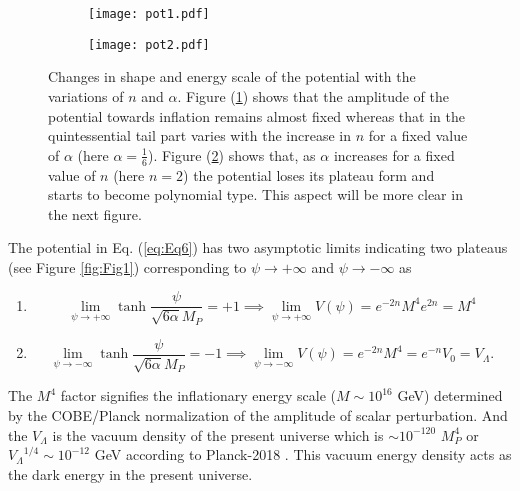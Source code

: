 \documentclass[a4paper,11pt]{article}
\begin{document}
\begin{figure}[H]
    \begin{subfigure}{0.5\linewidth}
  \centering
   \texttt{[image: pot1.pdf]}
   \subcaption{}
   \label{fig:Fig2a}
\end{subfigure}
\begin{subfigure}{0.5\linewidth}
  \centering
   \texttt{[image: pot2.pdf]}
   \subcaption{}
    \label{fig:Fig2b}
\end{subfigure}
     \caption{Changes in shape and energy scale of the potential with the variations of $n$ and $\alpha$. Figure (\ref{fig:Fig2a}) shows that the amplitude of the potential towards inflation remains almost fixed whereas that in the quintessential tail part varies with the increase in $n$ for a fixed value of $\alpha$ (here $\alpha=\frac{1}{6}$). Figure (\ref{fig:Fig2b}) shows that, as $\alpha$ increases for a fixed value of $n$ (here $n=2$) the potential loses its plateau form and starts to become polynomial type. This aspect will be more clear in the next figure.}
    \label{fig:Fig2}
\end{figure}
The potential in Eq. (\ref{eq:Eq6}) has two asymptotic limits indicating two plateaus (see Figure \ref{fig:Fig1}) corresponding to $\psi\rightarrow +\infty$ and $\psi\rightarrow -\infty$ as
\begin{enumerate}
    \item \begin{equation}
    \lim_{\psi\rightarrow +\infty}\tanh{\frac{\psi}{\sqrt{6\alpha}M_P}}=+1 \implies \lim_{\psi\rightarrow +\infty}V(\psi)=e^{-2n}M^4 e^{2n}=M^4
    \label{eq:limit1}
\end{equation}
\item \begin{equation}
    \lim_{\psi\rightarrow -\infty}\tanh{\frac{\psi}{\sqrt{6\alpha}M_P}}=-1 \implies \lim_{\psi\rightarrow -\infty}V(\psi)=e^{-2n}M^4=e^{-n}V_0 = V_{\Lambda}.
    \label{eq:limit2}
    \end{equation}
\end{enumerate}
The $M^4$ factor signifies the inflationary energy scale ($M\sim 10^{16}$ GeV) determined by the COBE/Planck normalization of the amplitude of scalar perturbation. And the $V_{\Lambda}$ is the vacuum density of the present universe which is $\sim 10^{-120}$ $M_P^4$ or $ {V_{\Lambda}}^{1/4}\sim 10^{-12}$ GeV according to Planck-2018 \cite{Planck:2018vyg,Planck:2018jri}. This vacuum energy density acts as the dark energy in the present universe.\par
\end{document}
